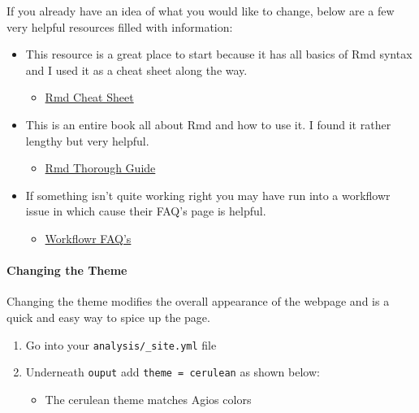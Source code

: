 \documentclass[openany]{article}
\providecommand{\tightlist}{%
  \setlength{\itemsep}{0pt}\setlength{\parskip}{0pt}}
\let\oldparagraph\paragraph
\renewcommand{\paragraph}[1]{\oldparagraph{#1}\mbox{}}
\begin{document}
If you already have an idea of what you would like to change, below are a few very helpful resources filled with information:

\begin{itemize}
\tightlist
\item
  This resource is a great place to start because it has all basics of Rmd syntax and I used it as a cheat sheet along the way.

  \begin{itemize}
  \tightlist
  \item
    \href{https://rmarkdown.rstudio.com/authoring_basics.html}{Rmd Cheat Sheet}
  \end{itemize}
\item
  This is an entire book all about Rmd and how to use it. I found it rather lengthy but very helpful.

  \begin{itemize}
  \tightlist
  \item
    \href{https://bookdown.org/yihui/rmarkdown/html-document.html\#appearance_and_style}{Rmd Thorough Guide}
  \end{itemize}
\item
  If something isn't quite working right you may have run into a workflowr issue in which cause their FAQ's page is helpful.

  \begin{itemize}
  \tightlist
  \item
    \href{https://jdblischak.github.io/workflowr/articles/wflow-05-faq.html}{Workflowr FAQ's}
  \end{itemize}
\end{itemize}

\hypertarget{changing-the-theme}{%
\paragraph{Changing the Theme}\label{changing-the-theme}}

Changing the theme modifies the overall appearance of the webpage and is a quick and easy way to spice up the page.

\begin{enumerate}
\def\labelenumi{\arabic{enumi}.}
\tightlist
\item
  Go into your \texttt{analysis/\_site.yml} file
\item
  Underneath \texttt{ouput} add \texttt{theme\ =\ cerulean} as shown below:

  \begin{itemize}
  \tightlist
  \item
    The cerulean theme matches Agios colors
  \end{itemize}
\end{enumerate}
\end{document}
